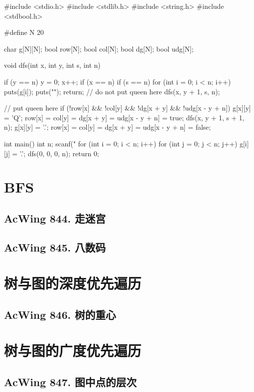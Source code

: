 \begin{mycpptwocol}
#include <stdio.h>
#include <stdlib.h>
#include <string.h>
#include <stdbool.h>

#define N 20

char g[N][N];
bool row[N];
bool col[N];
bool dg[N];
bool udg[N];

void dfs(int x, int y, int s, int n)
{
    if (y == n) {
        y = 0;
        x++;
    }
    if (x == n) {
        if (s == n) {
            for (int i = 0; i < n; i++) {
                puts(g[i]);
            }
            puts("");
        }
        return;
    }
    // do not put queen here
    dfs(x, y + 1, s, n);

    // put queen here
    if (!row[x] && !col[y] && !dg[x + y] && !udg[x - y + n]) {
        g[x][y] = 'Q';
        row[x] = col[y] = dg[x + y] = udg[x - y + n] = true;
        dfs(x, y + 1, s + 1, n);
        g[x][y] = '.';
        row[x] = col[y] = dg[x + y] = udg[x - y + n] = false;
    }
}

int main()
{
    int n;
    scanf("%
    for (int i = 0; i < n; i++) {
        for (int j = 0; j < n; j++) {
            g[i][j] = '.';
        }
    }
    dfs(0, 0, 0, n);
    return 0;
}
\end{mycpptwocol}

\section{BFS}
\subsection{AcWing 844. 走迷宫}
\subsection{AcWing 845. 八数码}

\section{树与图的深度优先遍历}
\subsection{AcWing 846. 树的重心}

\section{树与图的广度优先遍历}
\subsection{AcWing 847. 图中点的层次}

